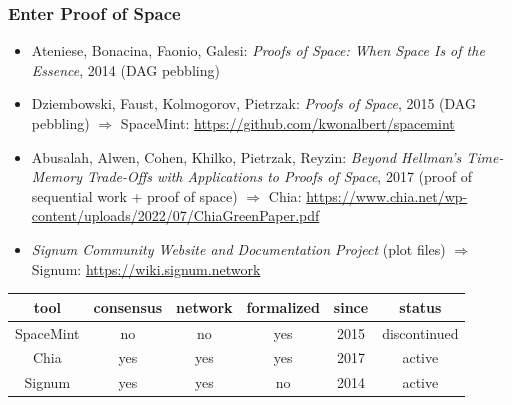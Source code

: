 \documentclass[11pt]{beamer}  %
\begin{document}
\begin{frame}\frametitle{Enter Proof of Space}

  \begin{greenbox}{}
    \begin{itemize}
    \item Ateniese, Bonacina, Faonio, Galesi: \emph{Proofs of Space: When Space Is of the Essence}, 2014 (DAG pebbling)
    \item Dziembowski, Faust, Kolmogorov, Pietrzak: \emph{Proofs of Space}, 2015 (DAG pebbling) $\Rightarrow$
      {\color{red}SpaceMint}: \url{https://github.com/kwonalbert/spacemint}
    \item Abusalah, Alwen, Cohen, Khilko, Pietrzak, Reyzin: \emph{Beyond Hellman's Time-Memory Trade-Offs with Applications to Proofs of Space}, 2017 (proof of sequential work + proof of space) $\Rightarrow$ {\color{red}Chia}: \url{https://www.chia.net/wp-content/uploads/2022/07/ChiaGreenPaper.pdf}
    \item \emph{Signum Community Website and Documentation Project} (plot files) $\Rightarrow$ {\color{red}Signum}: \url{https://wiki.signum.network}
    \end{itemize}

  \begin{center}
    {\small\begin{tabular}{c|c|c|c|c|c}
      tool & consensus & network & formalized & since & status \\\hline\hline
      SpaceMint & no & no & yes & 2015 & discontinued\\\hline
      Chia & yes & yes & yes & 2017 & active\\\hline
      Signum & yes & yes & \alert{no} & 2014 & active\\\hline
    \end{tabular}}
  \end{center}
  \end{greenbox}
  
\end{frame}
\end{document}
